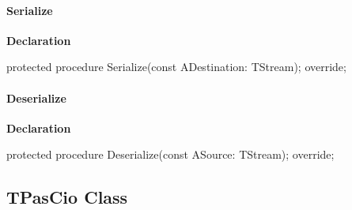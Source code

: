 \documentclass{report}
\newif\ifpdf
\begin{document}
\paragraph*{Serialize}\hspace*{\fill}

\label{PasDoc_Items.TPasProperty-Serialize}
\begin{list}{}{
\setlength{\itemindent}{0cm}
\setlength{\listparindent}{0cm}
\setlength{\leftmargin}{\evensidemargin}
\addtolength{\leftmargin}{\tmplength}
\settowidth{\labelsep}{X}
\addtolength{\leftmargin}{\labelsep}
\setlength{\labelwidth}{\tmplength}
}
\item[\textbf{Declaration}\hfill]
\ifpdf
\begin{flushleft}
\fi
\begin{ttfamily}
protected procedure Serialize(const ADestination: TStream); override;\end{ttfamily}

\ifpdf
\end{flushleft}
\fi

\end{list}
\paragraph*{Deserialize}\hspace*{\fill}

\label{PasDoc_Items.TPasProperty-Deserialize}
\begin{list}{}{
\setlength{\itemindent}{0cm}
\setlength{\listparindent}{0cm}
\setlength{\leftmargin}{\evensidemargin}
\addtolength{\leftmargin}{\tmplength}
\settowidth{\labelsep}{X}
\addtolength{\leftmargin}{\labelsep}
\setlength{\labelwidth}{\tmplength}
}
\item[\textbf{Declaration}\hfill]
\ifpdf
\begin{flushleft}
\fi
\begin{ttfamily}
protected procedure Deserialize(const ASource: TStream); override;\end{ttfamily}

\ifpdf
\end{flushleft}
\fi

\end{list}
\ifpdf
\subsection*{\large{\textbf{TPasCio Class}}\normalsize\hspace{1ex}\hrulefill}
\else
\end{document}
